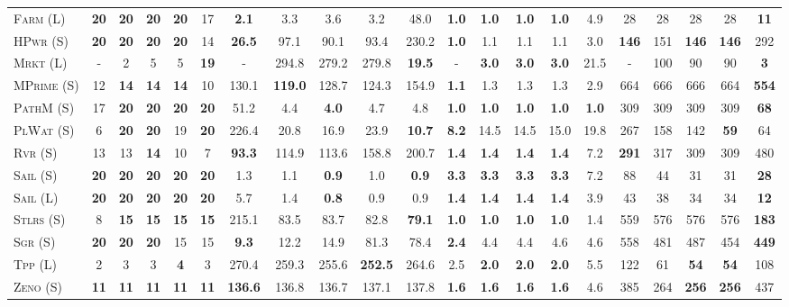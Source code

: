 \begin{table}[tb]
{\begin{tabular}{|l||ccccc||ccccc||ccccc||ccccc||}
\textsc{Farm} (L)&\textbf{20}&\textbf{20}&\textbf{20}&\textbf{20}&17&\textbf{2.1}&3.3&3.6&3.2&48.0&\textbf{1.0}&\textbf{1.0}&\textbf{1.0}&\textbf{1.0}&4.9&28&28&28&28&\textbf{11}\\
\textsc{HPwr} (S)&\textbf{20}&\textbf{20}&\textbf{20}&\textbf{20}&14&\textbf{26.5}&97.1&90.1&93.4&230.2&\textbf{1.0}&1.1&1.1&1.1&3.0&\textbf{146}&151&\textbf{146}&\textbf{146}&292\\
\textsc{Mrkt} (L)&-&2&5&5&\textbf{19}&-&294.8&279.2&279.8&\textbf{19.5}&-&\textbf{3.0}&\textbf{3.0}&\textbf{3.0}&21.5&-&100&90&90&\textbf{3}\\
\textsc{MPrime} (S)&12&\textbf{14}&\textbf{14}&\textbf{14}&10&130.1&\textbf{119.0}&128.7&124.3&154.9&\textbf{1.1}&1.3&1.3&1.3&2.9&664&666&666&664&\textbf{554}\\
\textsc{PathM} (S)&17&\textbf{20}&\textbf{20}&\textbf{20}&\textbf{20}&51.2&4.4&\textbf{4.0}&4.7&4.8&\textbf{1.0}&\textbf{1.0}&\textbf{1.0}&\textbf{1.0}&\textbf{1.0}&309&309&309&309&\textbf{68}\\
\textsc{PlWat} (S)&6&\textbf{20}&\textbf{20}&19&\textbf{20}&226.4&20.8&16.9&23.9&\textbf{10.7}&\textbf{8.2}&14.5&14.5&15.0&19.8&267&158&142&\textbf{59}&64\\
\textsc{Rvr} (S)&13&13&\textbf{14}&10&7&\textbf{93.3}&114.9&113.6&158.8&200.7&\textbf{1.4}&\textbf{1.4}&\textbf{1.4}&\textbf{1.4}&7.2&\textbf{291}&317&309&309&480\\
\textsc{Sail} (S)&\textbf{20}&\textbf{20}&\textbf{20}&\textbf{20}&\textbf{20}&1.3&1.1&\textbf{0.9}&1.0&\textbf{0.9}&\textbf{3.3}&\textbf{3.3}&\textbf{3.3}&\textbf{3.3}&7.2&88&44&31&31&\textbf{28}\\
\textsc{Sail} (L)&\textbf{20}&\textbf{20}&\textbf{20}&\textbf{20}&\textbf{20}&5.7&1.4&\textbf{0.8}&0.9&0.9&\textbf{1.4}&\textbf{1.4}&\textbf{1.4}&\textbf{1.4}&3.9&43&38&34&34&\textbf{12}\\
\textsc{Stlrs} (S)&8&\textbf{15}&\textbf{15}&\textbf{15}&\textbf{15}&215.1&83.5&83.7&82.8&\textbf{79.1}&\textbf{1.0}&\textbf{1.0}&\textbf{1.0}&\textbf{1.0}&1.4&559&576&576&576&\textbf{183}\\
\textsc{Sgr} (S)&\textbf{20}&\textbf{20}&\textbf{20}&15&15&\textbf{9.3}&12.2&14.9&81.3&78.4&\textbf{2.4}&4.4&4.4&4.6&4.6&558&481&487&454&\textbf{449}\\
\textsc{Tpp} (L)&2&3&3&\textbf{4}&3&270.4&259.3&255.6&\textbf{252.5}&264.6&2.5&\textbf{2.0}&\textbf{2.0}&\textbf{2.0}&5.5&122&61&\textbf{54}&\textbf{54}&108\\
\textsc{Zeno} (S)&\textbf{11}&\textbf{11}&\textbf{11}&\textbf{11}&\textbf{11}&\textbf{136.6}&136.8&136.7&137.1&137.8&\textbf{1.6}&\textbf{1.6}&\textbf{1.6}&\textbf{1.6}&4.6&385&264&\textbf{256}&\textbf{256}&437\\

\end{tabular}}
\end{table}
